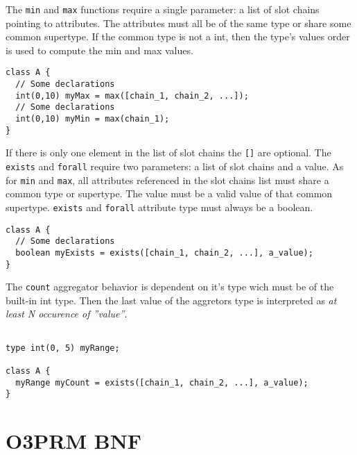 \documentclass[singlespacing,12pt,a4paper]{article}
\begin{document}
The \verb+min+ and \verb+max+ functions require a single parameter: a list of
slot chains pointing to attributes. The attributes must all be of the same
type or share some common supertype. If the common type is not a int, then the
type's values order is used to compute the min and max values.

\begin{footnotesize}
\begin{verbatim}
class A {
  // Some declarations
  int(0,10) myMax = max([chain_1, chain_2, ...]);
  // Some declarations
  int(0,10) myMin = max(chain_1);
}
\end{verbatim}
\end{footnotesize}

If there is only one element in the list of slot chains the \verb+[]+ are
optional. The \verb+exists+ and \verb+forall+ require two parameters: a list
of slot chains and a value. As for \verb+min+ and \verb+max+, all attributes
referenced in the slot chains list must share a common type or supertype. The
value must be a valid value of that common supertype. \verb+exists+ and
\verb+forall+ attribute type must always be a boolean.

\begin{footnotesize}
\begin{verbatim}
class A {
  // Some declarations
  boolean myExists = exists([chain_1, chain_2, ...], a_value);
}
\end{verbatim}
\end{footnotesize}

The \verb+count+ aggregator behavior is dependent on it's type wich must be of
the built-in int type. Then the last value of the aggretors type is interpreted
as \emph{at least N occurence of ''value''}.

\begin{footnotesize}
\begin{verbatim}

type int(0, 5) myRange;

class A {
  myRange myCount = exists([chain_1, chain_2, ...], a_value);
}
\end{verbatim}
\end{footnotesize}

\newpage
\section{O3PRM BNF}
\end{document}
